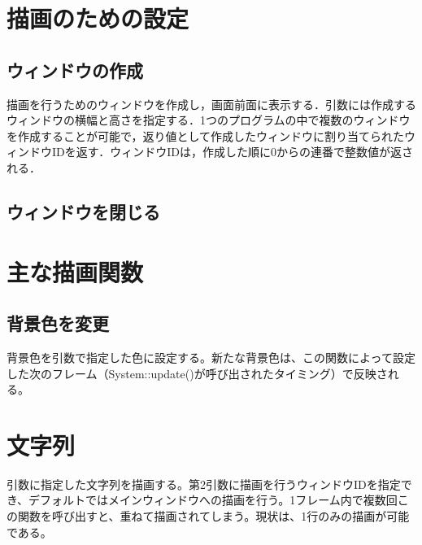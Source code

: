 \documentclass[a4paper, 11pt, oneside, onecolumn, openany]{jsarticle}
\begin{document}
\section{描画のための設定}
\subsection{ウィンドウの作成}
描画を行うためのウィンドウを作成し，画面前面に表示する．引数には作成するウィンドウの横幅と高さを指定する．1つのプログラムの中で複数のウィンドウを作成することが可能で，返り値として作成したウィンドウに割り当てられたウィンドウIDを返す．ウィンドウIDは，作成した順に0からの連番で整数値が返される．

\subsection{ウィンドウを閉じる}


\section{主な描画関数}
\subsection{背景色を変更}
背景色を引数で指定した色に設定する。新たな背景色は、この関数によって設定した次のフレーム（System::update()が呼び出されたタイミング）で反映される。

\section{文字列}
引数に指定した文字列を描画する。第2引数に描画を行うウィンドウIDを指定でき、デフォルトではメインウィンドウへの描画を行う。1フレーム内で複数回この関数を呼び出すと、重ねて描画されてしまう。現状は、1行のみの描画が可能である。
\end{document}
